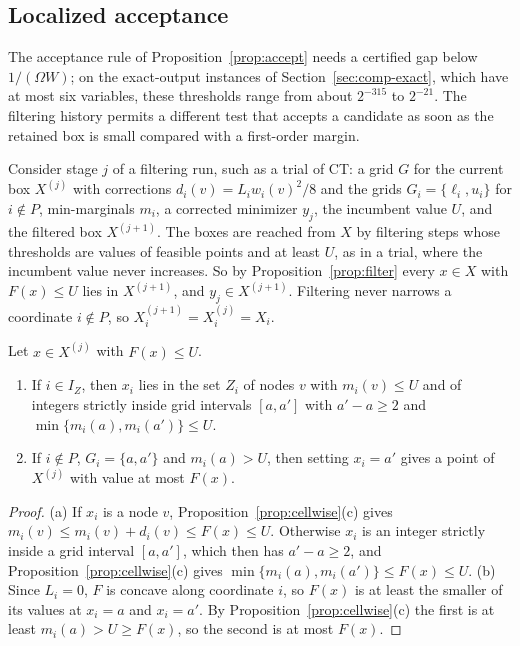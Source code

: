 \subsection{Localized acceptance}\label{sec:localized}
The acceptance rule of Proposition~\ref{prop:accept} needs a certified gap
below $1/(\Omega W)$; on the exact-output instances of
Section~\ref{sec:comp-exact}, which have at most six variables, these
thresholds range from about $2^{-315}$ to $2^{-21}$. The filtering history
permits a different test that accepts a candidate as soon as the retained box
is small compared with a first-order margin.

Consider stage $j$ of a filtering run, such as a trial of CT: a grid $G$ for
the current box $X^{(j)}$ with corrections $d_i(v)=L_iw_i(v)^2/8$ and the
grids $G_i=\{\ell_i,u_i\}$ for $i\notin P$, min-marginals $m_i$, a corrected
minimizer $y_j$, the incumbent value $U$, and the filtered box $X^{(j+1)}$.
The boxes are reached from $X$ by filtering steps whose thresholds are values
of feasible points and at least $U$, as in a trial, where the incumbent value
never increases. So by Proposition~\ref{prop:filter} every $x\in X$ with
$F(x)\le U$ lies in $X^{(j+1)}$, and $y_j\in X^{(j+1)}$. Filtering never
narrows a coordinate $i\notin P$, so $X^{(j+1)}_i=X^{(j)}_i=X_i$.

\begin{lemma}\label{lem:node}
Let $x\in X^{(j)}$ with $F(x)\le U$.
\begin{enumerate}[label=(\alph*)]
\item If $i\in I_Z$, then $x_i$ lies in the set $Z_i$ of nodes $v$ with
$m_i(v)\le U$ and of integers strictly inside grid intervals $[a,a']$ with
$a'-a\ge2$ and $\min\{m_i(a),m_i(a')\}\le U$.
\item If $i\notin P$, $G_i=\{a,a'\}$ and $m_i(a)>U$, then setting $x_i=a'$
gives a point of $X^{(j)}$ with value at most $F(x)$.
\end{enumerate}
\end{lemma}

\begin{proof}
(a) If $x_i$ is a node $v$, Proposition~\ref{prop:cellwise}(c) gives
$m_i(v)\le m_i(v)+d_i(v)\le F(x)\le U$. Otherwise $x_i$ is an integer strictly
inside a grid interval $[a,a']$, which then has $a'-a\ge2$, and
Proposition~\ref{prop:cellwise}(c) gives $\min\{m_i(a),m_i(a')\}\le F(x)\le U$.
(b) Since $L_i=0$, $F$ is concave along coordinate $i$, so $F(x)$ is at least
the smaller of its values at $x_i=a$ and $x_i=a'$. By
Proposition~\ref{prop:cellwise}(c) the first is at least $m_i(a)>U\ge F(x)$,
so the second is at most $F(x)$.
\end{proof}

